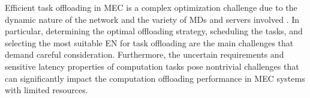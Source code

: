 \documentclass[12pt,draftclsnofoot,onecolumn]{IEEEtran}
\begin{document}
Efficient task offloading in MEC is a complex optimization challenge due to the dynamic nature of the network and the variety of MDs and servers involved \cite{jiang2019toward} \cite{TNSE-WU-24}. In particular, determining the optimal offloading strategy, scheduling the tasks, and selecting the most suitable EN for task offloading are the main challenges that demand careful consideration. Furthermore, the uncertain requirements and sensitive latency properties of computation tasks pose nontrivial challenges that can significantly impact the computation offloading performance in MEC systems with limited resources.



















\end{document}
